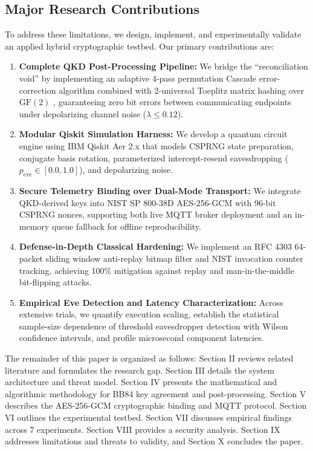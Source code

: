 \documentclass[journal,10pt,twocolumn]{article}
\begin{document}
\subsection{Major Research Contributions}
To address these limitations, we design, implement, and experimentally validate an applied hybrid cryptographic testbed. Our primary contributions are:
\begin{enumerate}
    \item \textbf{Complete QKD Post-Processing Pipeline:} We bridge the ``reconciliation void'' by implementing an adaptive 4-pass permutation Cascade error-correction algorithm \cite{brassard1994secret} combined with 2-universal Toeplitz matrix hashing over $\text{GF}(2)$ \cite{bennett1995generalized}, guaranteeing zero bit errors between communicating endpoints under depolarizing channel noise ($\lambda \le 0.12$).
    \item \textbf{Modular Qiskit Simulation Harness:} We develop a quantum circuit engine using IBM Qiskit Aer 2.x that models CSPRNG state preparation, conjugate basis rotation, parameterized intercept-resend eavesdropping ($p_{\text{eve}} \in [0.0, 1.0]$), and depolarizing noise.
    \item \textbf{Secure Telemetry Binding over Dual-Mode Transport:} We integrate QKD-derived keys into NIST SP 800-38D AES-256-GCM with 96-bit CSPRNG nonces, supporting both live MQTT broker deployment and an in-memory queue fallback for offline reproducibility.
    \item \textbf{Defense-in-Depth Classical Hardening:} We implement an RFC 4303 64-packet sliding window anti-replay bitmap filter and NIST invocation counter tracking, achieving 100\% mitigation against replay and man-in-the-middle bit-flipping attacks.
    \item \textbf{Empirical Eve Detection and Latency Characterization:} Across extensive trials, we quantify execution scaling, establish the statistical sample-size dependence of threshold eavesdropper detection with Wilson confidence intervals, and profile microsecond component latencies.
\end{enumerate}

The remainder of this paper is organized as follows: Section II reviews related literature and formulates the research gap. Section III details the system architecture and threat model. Section IV presents the mathematical and algorithmic methodology for BB84 key agreement and post-processing. Section V describes the AES-256-GCM cryptographic binding and MQTT protocol. Section VI outlines the experimental testbed. Section VII discusses empirical findings across 7 experiments. Section VIII provides a security analysis. Section IX addresses limitations and threats to validity, and Section X concludes the paper.
\end{document}
